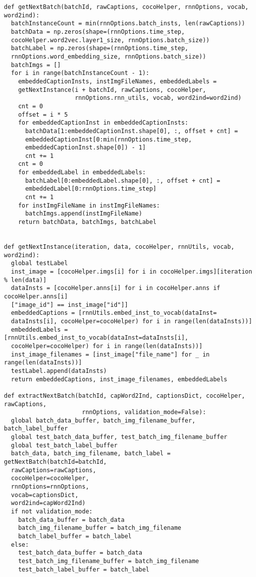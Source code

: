 \begin{latin}
\begin{verbatim}
def getNextBatch(batchId, rawCaptions, cocoHelper, rnnOptions, vocab, word2ind):
  batchInstanceCount = min(rnnOptions.batch_insts, len(rawCaptions))
  batchData = np.zeros(shape=(rnnOptions.time_step, 
  cocoHelper.word2vec.layer1_size, rnnOptions.batch_size))
  batchLabel = np.zeros(shape=(rnnOptions.time_step, 
  rnnOptions.word_embedding_size, rnnOptions.batch_size))
  batchImgs = []
  for i in range(batchInstanceCount - 1):
    embeddedCaptionInsts, instImgFileNames, embeddedLabels = 
    getNextInstance(i + batchId, rawCaptions, cocoHelper,
                    rnnOptions.rnn_utils, vocab, word2ind=word2ind)
    cnt = 0
    offset = i * 5
    for embeddedCaptionInst in embeddedCaptionInsts:
      batchData[1:embeddedCaptionInst.shape[0], :, offset + cnt] = 
      embeddedCaptionInst[0:min(rnnOptions.time_step, 
      embeddedCaptionInst.shape[0]) - 1]
      cnt += 1
    cnt = 0
    for embeddedLabel in embeddedLabels:
      batchLabel[0:embeddedLabel.shape[0], :, offset + cnt] = 
      embeddedLabel[0:rnnOptions.time_step]
      cnt += 1
    for instImgFileName in instImgFileNames:
      batchImgs.append(instImgFileName)
    return batchData, batchImgs, batchLabel


def getNextInstance(iteration, data, cocoHelper, rnnUtils, vocab, word2ind):
  global testLabel
  inst_image = [cocoHelper.imgs[i] for i in cocoHelper.imgs][iteration % len(data)]
  dataInsts = [cocoHelper.anns[i] for i in cocoHelper.anns if cocoHelper.anns[i]
  ["image_id"] == inst_image["id"]]
  embeddedCaptions = [rnnUtils.embed_inst_to_vocab(dataInst=
  dataInsts[i], cocoHelper=cocoHelper) for i in range(len(dataInsts))]
  embeddedLabels = [rnnUtils.embed_inst_to_vocab(dataInst=dataInsts[i], 
  cocoHelper=cocoHelper) for i in range(len(dataInsts))]
  inst_image_filenames = [inst_image["file_name"] for _ in range(len(dataInsts))]
  testLabel.append(dataInsts)	
  return embeddedCaptions, inst_image_filenames, embeddedLabels
  
def extractNextBatch(batchId, capWord2Ind, captionsDict, cocoHelper, rawCaptions,
                      rnnOptions, validation_mode=False):
  global batch_data_buffer, batch_img_filename_buffer, batch_label_buffer
  global test_batch_data_buffer, test_batch_img_filename_buffer 
  global test_batch_label_buffer
  batch_data, batch_img_filename, batch_label = getNextBatch(batchId=batchId,
  rawCaptions=rawCaptions,
  cocoHelper=cocoHelper,
  rnnOptions=rnnOptions,
  vocab=captionsDict,
  word2ind=capWord2Ind)
  if not validation_mode:
    batch_data_buffer = batch_data
    batch_img_filename_buffer = batch_img_filename
    batch_label_buffer = batch_label
  else:
    test_batch_data_buffer = batch_data
    test_batch_img_filename_buffer = batch_img_filename
    test_batch_label_buffer = batch_label
 
\end{verbatim}
\end{latin}

